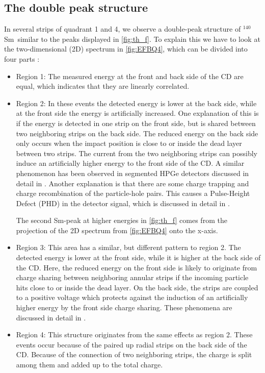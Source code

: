 \documentclass[twoside,english]{uiofysmaster/uiofysmaster}
\newcommand{\Sm}{$^{140}$Sm} %
\let\orgautoref\autoref
\renewcommand{\autoref}
        {%
		 \def\sectionautorefname{Section}%
		 \def\subsectionautorefname{Section}%
		 \def\subsubsectionautorefname{Section}%
		 \def\chapterautorefname{Chapter}%
          \orgautoref}
\begin{document}
\subsection{The double peak structure}\label{ssec:DPS}
In several strips of quadrant 1 and 4, we observe a double-peak structure of \Sm\ similar to the peaks displayed in \autoref{fig:th_f}. 
To explain this we have to look at the two-dimensional (2D) spectrum in \autoref{fig:EFBQ4}, which can be divided into four parts \cite{Rosiak}:
\begin{itemize}
	\item Region 1: The measured energy at the front and back side of the CD are equal, which indicates that they are linearly correlated.
	\item Region 2: In these events the detected energy is lower at the back side, while at the front side the energy is artificially increased. 
	One explanation of this is if the energy is detected in one strip on the front side, but is shared between two neighboring strips on the back side.
	The reduced energy on the back side only occurs when the impact position is close to or inside the dead layer between two strips. 
	The current from the two neighboring strips can possibly induce an artificially higher energy to the front side of the CD. 
	A similar phenomenon has been observed in segmented HPGe detectors discussed in detail in \cite{Bruyneel2006a, Bruyneel2006b, Bruyneel, Descovich2005, Abt2017}.	
	Another explanation is that there are some charge trapping and charge recombination of the particle-hole pairs. 
	This causes a Pulse-Height Defect (PHD) in the detector signal, which is discussed in detail in \cite{Miller1962, Wilkins1971}.
	
	The second Sm-peak at higher energies in \autoref{fig:th_f} comes from the projection of the 2D spectrum from \autoref{fig:EFBQ4} onto the x-axis.
	\item Region 3: This area has a similar, but different pattern to region 2. 
	The detected energy is lower at the front side, while it is higher at the back side of the CD. 
	Here, the reduced energy on the front side is likely to originate from charge sharing between neighboring annular strips if the incoming particle hits close to or inside the dead layer. 
	 On the back side, the strips are coupled to a positive voltage which protects against the induction of an artificially higher energy by the front side charge sharing. 
	These phenomena are discussed in detail in \cite{Grassi2014, Kramberger2002}.
	\item Region 4: This structure originates from the same effects as region 2.
	These events occur because of the paired up radial strips on the back side of the CD.  
	Because of the connection of two neighboring strips, the charge is split among them and added up to the total charge.
\end{itemize}
\end{document}
